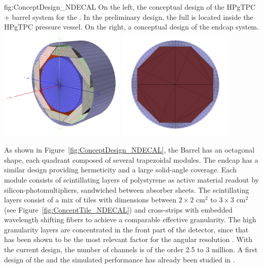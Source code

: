 \begin{dunefigure}{fig:ConceptDesign_NDECAL}
{On the left, the conceptual design of the HPgTPC +  barrel system for the . In the preliminary design, the full  is located inside the HPgTPC pressure vessel. On the right, a conceptual design of the  endcap system.}
\includegraphics[width=0.45\textwidth]{graphics/ConceptECALND.png}
\includegraphics[width=0.42\textwidth]{graphics/ECAL_Endcap_System.png}
\end{dunefigure}
As shown in Figure~\ref{fig:ConceptDesign_NDECAL}, the  Barrel has an octagonal shape, each quadrant composed of several trapezoidal modules. The  endcap has a similar design providing hermeticity and a large solid-angle coverage. Each module consists of scintillating layers of polystyrene as active material readout by silicon-photomultipliers, sandwiched between absorber sheets. The scintillating layers consist of a mix of tiles with dimensions between $2\times2$ cm$^2$ to $3\times3$ cm$^2$ (see Figure~\ref{fig:ConceptTile_NDECAL}) and cross-strips with embedded wavelength shifting fibers to achieve a comparable effective granularity. The high granularity layers are concentrated in the front part of the detector, since that has been shown to be the most relevant factor for the angular resolution \cite{Emberger:2018pgr}. With the current design, the number of channels is of the order 2.5 to 3 million. A first design of the  and the simulated performance has already been studied in \cite{Emberger:2018pgr}.

